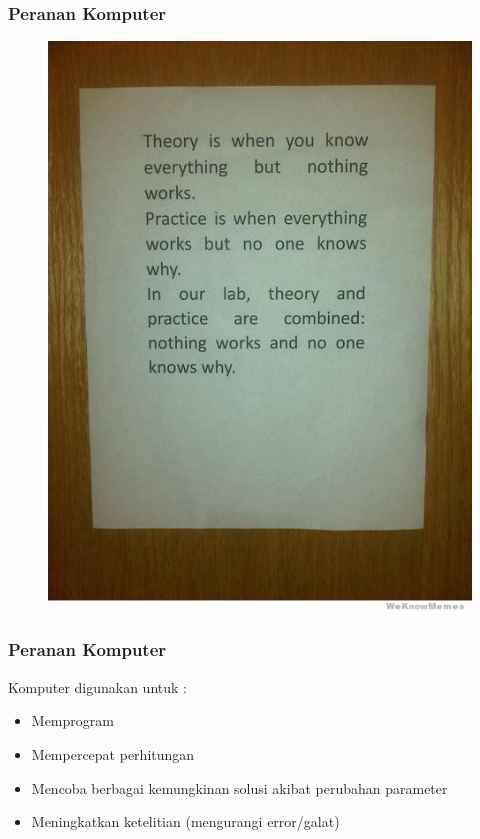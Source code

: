 \documentclass{beamer}
\begin{document}
\begin{frame}
\frametitle{Peranan Komputer}
\begin{figure}[htp]
\centering
\includegraphics[scale=0.50]{theory-is-when-you-know-everything-but-nothing-works.jpg}
\end{figure}
\end{frame}


\begin{frame}
\frametitle{Peranan Komputer}
Komputer digunakan untuk :
\begin{itemize}
\item Memprogram
\item Mempercepat perhitungan 
\item Mencoba berbagai kemungkinan solusi akibat perubahan parameter
\item Meningkatkan ketelitian (mengurangi error/galat)
\end{itemize}
\end{frame}
\end{document}
